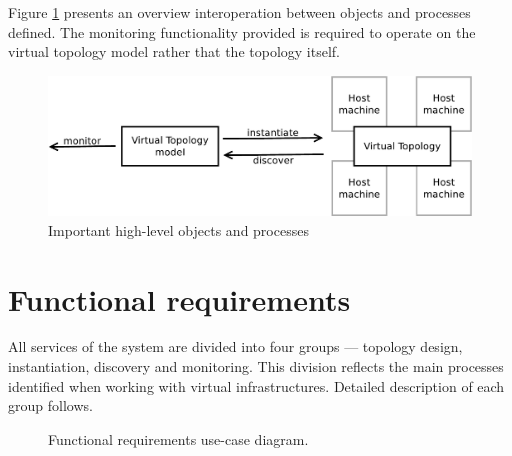 \documentclass[11pt,openany]{book}
\begin{document}
      Figure \ref{fig:req:overview} presents an overview interoperation between objects and processes defined. The
      monitoring functionality provided is required to operate on the virtual topology model rather that the topology
      itself.

      \begin{figure}[H]
        \centering
        \includegraphics[width=.7\textwidth]{img/req/overview.pdf}

        \caption{Important high-level objects and processes}
        \label{fig:req:overview}
      \end{figure}


    \section{Functional requirements}
    \label{sec:req:func}

      All services of the system are divided into four groups --- topology design, instantiation, discovery and
      monitoring. This division reflects the main processes identified when working with virtual infrastructures.
      Detailed description of each group follows.

      \begin{figure}[H]
          \centering


          \caption{Functional requirements use-case diagram.}
        \end{figure}
\end{document}
